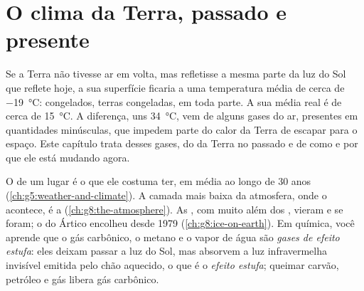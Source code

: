 \chapter{O clima da Terra, passado e presente}\label{ch:g9:climate-past-and-present}

Se a Terra não tivesse ar em volta, mas refletisse a mesma parte da luz
do Sol que reflete hoje, a sua superfície ficaria a uma temperatura média
de cerca de \qty{-19}{\degreeCelsius}:  congelados, terras
congeladas, em toda parte. A sua média real é de cerca de
\qty{15}{\degreeCelsius}. A diferença, uns \qty{34}{\degreeCelsius}, vem
de alguns gases do ar, presentes em quantidades minúsculas, que impedem
parte do calor da Terra de escapar para o espaço. Este capítulo trata
desses gases, do  da Terra no passado e de como e por que ele está
mudando agora.

\begin{recall}
O  de um lugar é o  que ele costuma ter, em média ao longo de
30 anos (\cref{ch:g5:weather-and-climate}). A camada mais baixa da
atmosfera, onde o  acontece, é a 
(\cref{ch:g8:the-atmosphere}). As , com  muito
além dos , vieram e se foram; o  do Ártico encolheu
desde 1979 (\cref{ch:g8:ice-on-earth}). Em química, você aprende que o
gás carbônico, o metano e o vapor de água são \emph{gases de efeito
estufa}: eles deixam passar a luz do Sol, mas absorvem a luz
infravermelha invisível emitida pelo chão aquecido, o que é o
\emph{efeito estufa}; queimar carvão, petróleo e gás libera gás carbônico.
\end{recall}

